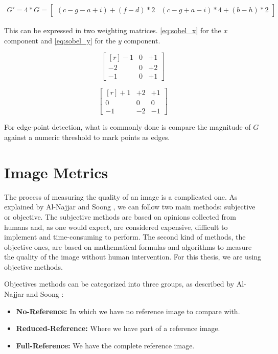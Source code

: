 \documentclass{cslthse-msc}
\begin{document}
\begin{equation}\label{eq:sobel_approximation}
\begin{split}
G' = 4 * G =\begin{bmatrix*}(c-g-a+i)+(f-d)*2 & (c-g+a-i)*4+(b-h)*2\end{bmatrix*}
\end{split}
\end{equation}

This can be expressed in two weighting matrices. \ref{eq:sobel_x} for the $x$ component and \ref{eq:sobel_y} for the $y$ component.

\begin{equation}
\begin{bmatrix*}[r]\label{eq:sobel_x}
-1 &  0 & +1 \\
-2 &  0 & +2 \\
-1 &  0 & +1
\end{bmatrix*}
\end{equation}

\begin{equation}
\begin{bmatrix*}[r]\label{eq:sobel_y}
+1 & +2 & +1 \\
 0 &  0 &  0 \\
-1 & -2 & -1
\end{bmatrix*}
\end{equation}

For edge-point detection, what is commonly done is compare the magnitude of $G$ against a numeric threshold to mark points as edges. 

\section{Image Metrics}
The process of measuring the quality of an image is a complicated one. As explained by Al-Najjar and Soong \cite{Yusra2012}, we can follow two main methods: subjective or objective. The subjective methods are based on opinions collected from humans and, as one would expect, are considered expensive, difficult to implement and time-consuming to perform. The second kind of methods, the objective ones, are based on mathematical formulas and algorithms to measure the quality of the image without human intervention. For this thesis, we are using objective methods. 

Objectives methods can be categorized into three groups, as described by Al-Najjar and Soong \cite{Yusra2012}:

\begin{itemize}
	\item \textbf{No-Reference:} In which we have no reference image to compare with.
	\item \textbf{Reduced-Reference:} Where we have part of a reference image.
	\item \textbf{Full-Reference:} We have the complete reference image.
\end{itemize}
\end{document}
